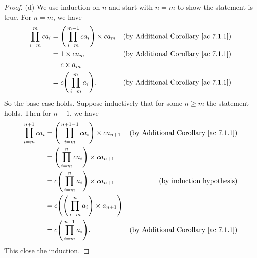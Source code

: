 \begin{proof}{(d)}
We use induction on \(n\) and start with \(n = m\) to show the statement is true.
For \(n = m\), we have
\begin{align*}
\prod_{i = m}^m ca_i &= \Bigg(\prod_{i = m}^{m - 1} ca_i\Bigg) \times ca_m & \text{(by Additional Corollary \ref{ac 7.1.1})} \\
&= 1 \times ca_m & \text{(by Additional Corollary \ref{ac 7.1.1})} \\
&= c \times a_m \\
&= c\Bigg(\prod_{i = m}^m a_i\Bigg). & \text{(by Additional Corollary \ref{ac 7.1.1})}
\end{align*}
So the base case holds.
Suppose inductively that for some \(n \geq m\) the statement holds.
Then for \(n + 1\), we have
\begin{align*}
\prod_{i = m}^{n + 1} ca_i &= \Bigg(\prod_{i = m}^{n + 1 - 1} ca_i\Bigg) \times ca_{n + 1} & \text{(by Additional Corollary \ref{ac 7.1.1})} \\
&= \Bigg(\prod_{i = m}^n ca_i\Bigg) \times ca_{n + 1} \\
&= c\Bigg(\prod_{i = m}^n a_i\Bigg) \times ca_{n + 1} & \text{(by induction hypothesis)} \\
&= c\Bigg(\Bigg(\prod_{i = m}^n a_i\Bigg) \times a_{n + 1}\Bigg) \\
&= c\Bigg(\prod_{i = m}^{n + 1} a_i\Bigg). & \text{(by Additional Corollary \ref{ac 7.1.1})}
\end{align*}
This close the induction.
\end{proof}

